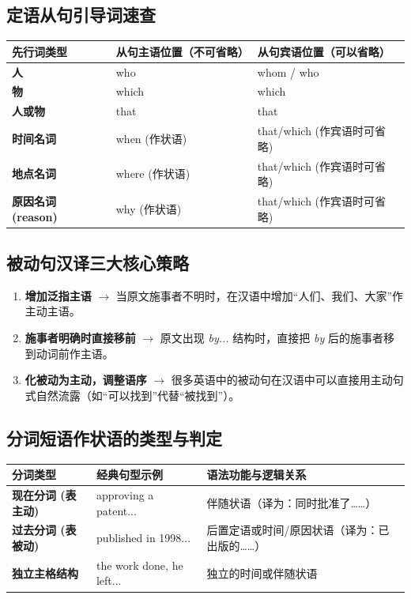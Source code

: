 \documentclass[cn,normal,11pt]{elegantnote}
\begin{document}
\subsection{定语从句引导词速查}
\noindent
\begin{tabularx}{\textwidth}{l X X}
  \toprule
  \textbf{先行词类型} & \textbf{从句主语位置（不可省略）} & \textbf{从句宾语位置（可以省略）} \\
  \midrule
  \textbf{人} & who & whom / who \\
  \midrule
  \textbf{物} & which & which \\
  \midrule
  \textbf{人或物} & that & that \\
  \midrule
  \textbf{时间名词} & when (作状语) & that/which (作宾语时可省略) \\
  \midrule
  \textbf{地点名词} & where (作状语) & that/which (作宾语时可省略) \\
  \midrule
  \textbf{原因名词 (reason)} & why (作状语) & that/which (作宾语时可省略) \\
  \bottomrule
\end{tabularx}

\subsection{被动句汉译三大核心策略}
\begin{enumerate}
  \item \textbf{增加泛指主语} $\rightarrow$ 当原文施事者不明时，在汉语中增加“人们、我们、大家”作主动主语。
  \item \textbf{施事者明确时直接移前} $\rightarrow$ 原文出现 \textit{by...} 结构时，直接把 \textit{by} 后的施事者移到动词前作主语。
  \item \textbf{化被动为主动，调整语序} $\rightarrow$ 很多英语中的被动句在汉语中可以直接用主动句式自然流露（如“可以找到”代替“被找到”）。
\end{enumerate}

\subsection{分词短语作状语的类型与判定}
\noindent
\begin{tabularx}{\textwidth}{l p{5cm} X}
  \toprule
  \textbf{分词类型} & \textbf{经典句型示例} & \textbf{语法功能与逻辑关系} \\
  \midrule
  \textbf{现在分词 (表主动)} & approving a patent... & 伴随状语（译为：同时批准了……） \\
  \midrule
  \textbf{过去分词 (表被动)} & published in 1998... & 后置定语或时间/原因状语（译为：已出版的……） \\
  \midrule
  \textbf{独立主格结构} & the work done, he left... & 独立的时间或伴随状语 \\
  \bottomrule
\end{tabularx}
\end{document}
